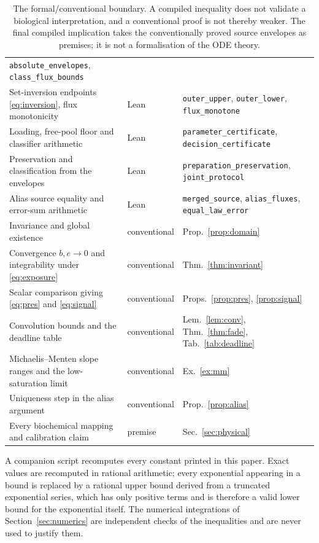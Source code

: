 \documentclass[11pt]{article}
\theoremstyle{definition}
\theoremstyle{remark}
\newcommand{\leanref}[1]{\texttt{\small #1}}
\begin{document}
\begin{table}[ht]
\begin{tabularx}{\textwidth}{llY}
\leanref{absolute\_\allowbreak envelopes}, \leanref{class\_\allowbreak flux\_\allowbreak bounds}\\
Set-inversion endpoints \eqref{eq:inversion}, flux monotonicity & Lean &
\leanref{outer\_\allowbreak upper}, \leanref{outer\_\allowbreak lower}, \leanref{flux\_\allowbreak monotone}\\
Loading, free-pool floor and classifier arithmetic & Lean &
\leanref{parameter\_\allowbreak certificate}, \leanref{decision\_\allowbreak certificate}\\
Preservation and classification from the envelopes & Lean &
\leanref{preparation\_\allowbreak preservation}, \leanref{joint\_\allowbreak protocol}\\
Alias source equality and error-sum arithmetic & Lean &
\leanref{merged\_\allowbreak source}, \leanref{alias\_\allowbreak fluxes}, \leanref{equal\_\allowbreak law\_\allowbreak error}\\
\midrule
Invariance and global existence & conventional & Prop.~\ref{prop:domain}\\
Convergence $b,e\to0$ and integrability under \eqref{eq:exposure} &
conventional & Thm.~\ref{thm:invariant}\\
Scalar comparison giving \eqref{eq:pres} and \eqref{eq:signal} & conventional &
Props.~\ref{prop:pres}, \ref{prop:signal}\\
Convolution bounds and the deadline table & conventional &
Lem.~\ref{lem:conv}, Thm.~\ref{thm:fade}, Tab.~\ref{tab:deadline}\\
Michaelis--Menten slope ranges and the low-saturation limit & conventional &
Ex.~\ref{ex:mm}\\
Uniqueness step in the alias argument & conventional &
Prop.~\ref{prop:alias}\\
Every biochemical mapping and calibration claim & premise &
Sec.~\ref{sec:physical}\\
\bottomrule
\end{tabularx}
\caption{The formal/conventional boundary. A compiled inequality does not
validate a biological interpretation, and a conventional proof is not thereby
weaker. The final compiled implication takes the conventionally proved source
envelopes as premises; it is not a formalisation of the ODE theory.}
\label{tab:lean}
\end{table}

A companion script recomputes every constant printed in this paper. Exact
values are recomputed in rational arithmetic; every exponential appearing in a
bound is replaced by a rational upper bound derived from a truncated
exponential series, which has only positive terms and is therefore a valid lower
bound for the exponential itself. The numerical integrations of
Section~\ref{sec:numerics} are independent checks of the inequalities and are
never used to justify them.
\end{document}
